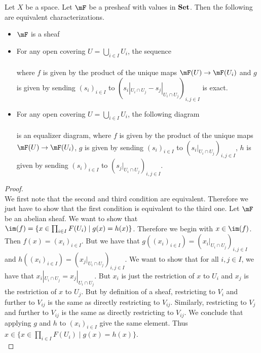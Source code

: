 \documentclass[a4paper]{article}
\begin{document}
\begin{thm}{}{} Let $X$ be a space. Let $\mF$ be a presheaf with values in $\bold{Set}$. Then the following are equivalent characterizations. 
\begin{itemize}
\item $\mF$ is a sheaf
\item For any open covering $U=\bigcup_{i\in I}U_i$, the sequence \\
\\
where $f$ is given by the product of the unique maps $\mF(U)\to\mF(U_i)$ and $g$ is given by sending $(s_i)_{i\in I}$ to $(s_i|_{U_i\cap U_j}-s_j|_{U_i\cap U_j})_{i,j\in I}$ is exact. 
\item For any open covering $U=\bigcup_{i\in I}U_i$, the following diagram \\
\\
is an equalizer diagram, where $f$ is given by the product of the unique maps $\mF(U)\to\mF(U_i)$, $g$ is given by sending $(s_i)_{i\in I}$ to $(s_i|_{U_i\cap U_j})_{i,j\in I}$, $h$ is given by sending $(s_i)_{i\in I}$ to $(s_j|_{U_i\cap U_j})_{i,j\in I}$. 
\end{itemize} 
\begin{proof}~\\
We first note that the second and third condition are equivalent. Therefore we just have to show that the first condition is equivalent to the third one. Let $\mF$ be an abelian sheaf. We want to show that $\im(f)=\{x\in\prod_{i\in I}F(U_i)\;|\;g(x)=h(x)\}$. Therefore we begin with $x\in\im(f)$. Then $f(x)=(x_i)_{i\in I}$. But we have that $g((x_i)_{i\in I})=(x_i|_{U_i\cap U_j})_{i,j\in I}$ and $h((x_i)_{i\in I})=(x_j|_{U_i\cap U_j})_{i,j\in I}$. We want to show that for all $i,j\in I$, we have that $x_i|_{U_i\cap U_j}=x_j|_{U_i\cap U_j}$. But $x_i$ is just the restriction of $x$ to $U_i$ and $x_j$ is the restriction of $x$ to $U_j$. But by definition of a sheaf, restricting to $V_i$ and further to $V_{ij}$ is the same as directly restricting to $V_{ij}$. Similarly, restricting to $V_j$ and further to $V_{ij}$ is the same as directly restricting to $V_{ij}$. We conclude that applying $g$ and $h$ to $(x_i)_{i\in I}$ give the same element. Thus $x\in\{x\in\prod_{i\in I}F(U_i)\;|\;g(x)=h(x)\}$. \\


\end{proof}
\end{thm}
\end{document}
